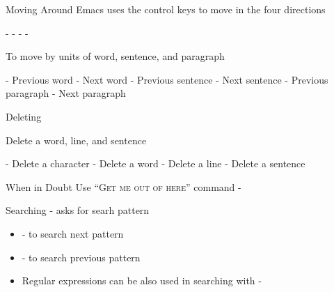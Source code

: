 \documentclass[newPxFont,sthlmFooter,nooffset]{beamer}
\begin{document}
\begin{frame}[t]{Moving Around}
Emacs uses the control keys to move in the four directions
\bigskip

- \keystroke{$\leftarrow$} \hfill
{}- \keystroke{$\downarrow$} \hfill
{}- \keystroke{$\uparrow$} \hfill
{}- \keystroke{$\rightarrow$} \hfill



\bigskip
To move by units of word, sentence, and paragraph

\bigskip
{}- Previous word \hfill
{}- Next word \hfill
{}- Previous sentence \hfill
{}- Next sentence \hfill
{}-\keystrokered{\{} Previous paragraph \hfill
{}-\keystrokered{\}} Next paragraph \hfill


\end{frame}



\begin{frame}[t]{Deleting}

Delete a word, line, and sentence
\bigskip

- Delete a character \hfill
{}- Delete a word \hfill
{}- Delete a line \hfill
{}- Delete a sentence \hfill

\bigskip
\begin{block}{When in Doubt}
Use ``\textsc{Get me out of here}'' command -
\end{block}
\end{frame}


\begin{frame}[t]{Searching}
- asks for searh pattern
\begin{itemize}
\item {}- to search next pattern
\item {}- to search previous pattern
\item Regular expressions can be also used in searching with -
\end{itemize}

\end{frame}
\end{document}
